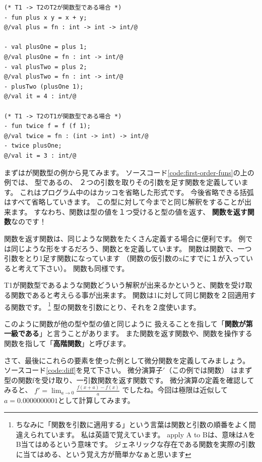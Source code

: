 \documentclass[11pt,a4paper]{jarticle}
\begin{document}
\begin{lstlisting}[caption=第一級関数,label=code:first-order-funs]
(* T1 -> T2のT2が関数型である場合 *)
- fun plus x y = x + y;
@/val plus = fn : int -> int -> int/@

- val plusOne = plus 1;
@/val plusOne = fn : int -> int/@
- val plusTwo = plus 2;
@/val plusTwo = fn : int -> int/@
- plusTwo (plusOne 1);
@/val it = 4 : int/@

(* T1 -> T2のT1が関数型である場合 *)
- fun twice f = f (f 1);
@/val twice = fn : (int -> int) -> int/@
- twice plusOne;
@/val it = 3 : int/@
\end{lstlisting}

まずはが関数型の例から見てみます。
ソースコード\ref{code:first-order-funs}の上の例では、
型であるの、
２つの引数を取りその引数を足す関数を定義しています。
これはプログラム中のはカッコを省略した形式です。
今後省略できる括弧はすべて省略していきます。
この型に対して今までと同じ解釈をすることが出来ます。
すなわち、関数は型の値を１つ受けると型の値を返す、
{\bfseries 関数を返す関数}なのです！

関数を返す関数は、同じような関数をたくさん定義する場合に便利です。
例では同じような形をするだろう、関数とを定義しています。
関数は関数で、一つ引数をとり1足す関数になっています
（関数の仮引数のxにすでに１が入っていると考えて下さい）。
関数も同様です。

T1が関数型であるような関数どういう解釈が出来るかというと、関数を受け取る関数であると考えらる事が出来ます。
関数は1に対して同じ関数を２回適用する関数です。
\footnote{
ちなみに「関数を引数に適用する」という言葉は関数と引数の順番をよく間違えられています。
私は英語で覚えています。
apply A to Bは、意味はAをB当てはめるという意味です。
ジェネリックな存在である関数を実際の引数に当てはめる、という覚え方が簡単かなぁと思います}
型の関数を引数にとり、それを２度使います。

このように関数が他の型や型の値と同じように
扱えることを指して「{\bfseries 関数が第一級である}」と言うことがあります。
また関数を返す関数や、関数を操作する関数を指して「{\bfseries 高階関数}」と呼びます。

さて、最後にこれらの要素を使った例として微分関数を定義してみましょう。
ソースコード\ref{code:diff}を見て下さい。
微分演算子$'$（この例では関数）
はまず型の関数fを受け取り、一引数関数を返す関数です。
微分演算の定義を確認してみると、
$f' = \lim_{a \to 0}\frac{f(x+a) - f(x)}{a}$
でしたね。今回は極限は近似して$a = 0.0000000001$として計算してみます。
\end{document}
